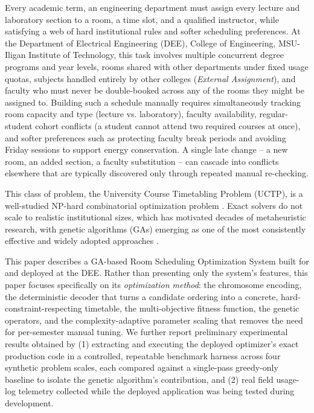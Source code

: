 \documentclass[conference]{IEEEtran}
\begin{document}
Every academic term, an engineering department must assign every lecture and laboratory section to a room, a time slot, and a qualified instructor, while satisfying a web of hard institutional rules and softer scheduling preferences. At the Department of Electrical Engineering (DEE), College of Engineering, MSU-Iligan Institute of Technology, this task involves multiple concurrent degree programs and year levels, rooms shared with other departments under fixed usage quotas, subjects handled entirely by other colleges (\emph{External Assignment}), and faculty who must never be double-booked across any of the rooms they might be assigned to. Building such a schedule manually requires simultaneously tracking room capacity and type (lecture vs. laboratory), faculty availability, regular-student cohort conflicts (a student cannot attend two required courses at once), and softer preferences such as protecting faculty break periods and avoiding Friday sessions to support energy conservation. A single late change -- a new room, an added section, a faculty substitution -- can cascade into conflicts elsewhere that are typically discovered only through repeated manual re-checking.

This class of problem, the University Course Timetabling Problem (UCTP), is a well-studied NP-hard combinatorial optimization problem \cite{abdelhalim2016}. Exact solvers do not scale to realistic institutional sizes, which has motivated decades of metaheuristic research, with genetic algorithms (GAs) emerging as one of the most consistently effective and widely adopted approaches \cite{subang2024,yan2025}.

This paper describes a GA-based Room Scheduling Optimization System built for and deployed at the DEE. Rather than presenting only the system's features, this paper focuses specifically on its \emph{optimization method}: the chromosome encoding, the deterministic decoder that turns a candidate ordering into a concrete, hard-constraint-respecting timetable, the multi-objective fitness function, the genetic operators, and the complexity-adaptive parameter scaling that removes the need for per-semester manual tuning. We further report preliminary experimental results obtained by (1) extracting and executing the deployed optimizer's exact production code in a controlled, repeatable benchmark harness across four synthetic problem scales, each compared against a single-pass greedy-only baseline to isolate the genetic algorithm's contribution, and (2) real field usage-log telemetry collected while the deployed application was being tested during development.
\end{document}
